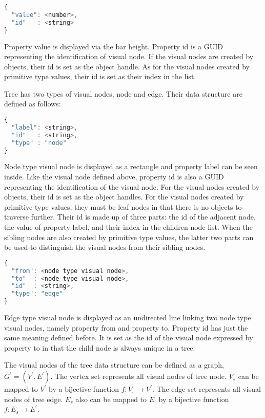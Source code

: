 \begin{lstlisting}[language=JavaScript]
{
  "value": <number>,
  "id"   : <string>
}
\end{lstlisting}

Property value is displayed via the bar height. Property id is a GUID representing the identification of visual node. If the visual nodes are created by objects, their id is set as the object handle. As for the visual nodes created by primitive type values, their id is set as their index in the list. 

Tree has two types of visual nodes, node and edge. Their data structure are defined as follows:

\begin{lstlisting}[language=JavaScript]
{
  "label": <string>,
  "id"   : <string>,
  "type" : "node"
}
\end{lstlisting}

Node type visual node is displayed as a rectangle and property label can be seen inside. Like the visual node defined above, property id is also a GUID representing the identification of the visual node. For the visual nodes created by objects, their id is set as the object handles. For the visual nodes created by primitive type values, they must be leaf nodes in that there is no objects to traverse further. Their id is made up of three parts: the id of the adjacent node, the value of property label, and their index in the children node list. When the sibling nodes are also created by primitive type values, the latter two parts can be used to distinguish the visual nodes from their sibling nodes.

\begin{lstlisting}[language=JavaScript]
{
  "from": <node type visual node>,
  "to"  : <node type visual node>,
  "id"  : <string>,
  "type": "edge"
}
\end{lstlisting}

Edge type visual node is displayed as an undirected line linking two node type visual nodes, namely property from and property to. Property id has just the same meaning defined before. It is set as the id of the visual node expressed by property to in that the child node is always unique in a tree. 

The visual nodes of the tree data structure can be defined as a graph, \(G^\prime = (V^\prime, E^\prime)\). The vertex set represents all visual nodes of tree node. \(V_s\) can be mapped to \(V^\prime\) by a bijective function \(f:V_s\rightarrow V^\prime\). The edge set represents all visual nodes of tree edge. \(E_s\) also can be mapped to \(E^\prime\) by a bijective function \(f:E_s\rightarrow E^\prime\).

